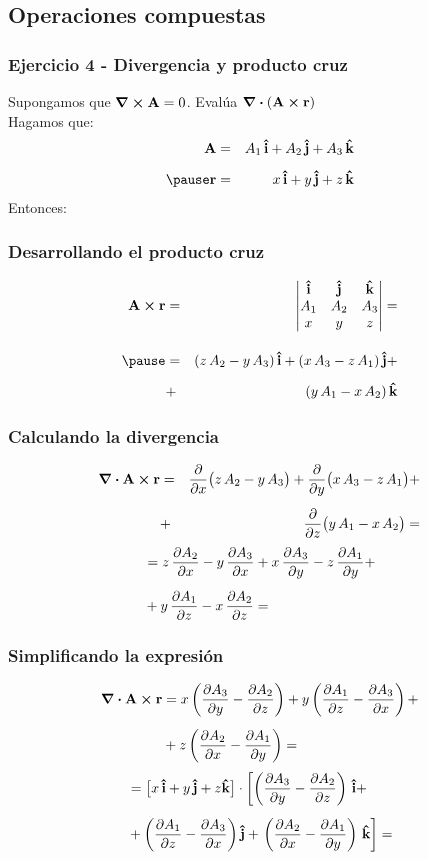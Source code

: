 \documentclass[12pt]{beamer}
\begin{document}
\subsection{Operaciones compuestas}

\begin{frame}
\frametitle{Ejercicio 4 - Divergencia y producto cruz}
Supongamos que $\curl{\vb{A}} = 0$. Evalúa $\div{(\vb{A} \cp \vb{r})}$
\\
\bigskip
\pause
Hagamos que:
\begin{eqnarray*}
\vb{A} &=& A_{1} \, \vu{i} + A_{2} \, \vu{j} + A_{3} \, \vu{k} \\[0.5em] \pause
\vb{r} &=& x \, \vu{i} + y \, \vu{j} + z \, \vu{k}
\end{eqnarray*}
Entonces:
\end{frame}
\begin{frame}
\frametitle{Desarrollando el producto cruz}
\begin{eqnarray*}
\vb{A} \cp \vb{r} &=& \mqty|
\vu{i} & \vu{j} & \vu{k} \\
A_{1} & A_{2} & A_{3} \\
x & y & z | = \\[1em] \pause
&=& (z \, A_{2} - y \, A_{3}) \, \vu{i} + (x \, A_{3} - z \, A_{1}) \, \vu{j} + \\[0.5em]
&+& (y \, A_{1} - x \, A_{2}) \, \vu{k} 
\end{eqnarray*}
\end{frame}
\begin{frame}
\frametitle{Calculando la divergencia}
\begin{eqnarray*}
\div{\vb{A} \cp \vb{r}} &=& \pdv{x} \big( z \, A_{2} - y \, A_{3} \big) + \pdv{y} \big( x \, A_{3} - z \, A_{1} \big) + \\[0.5em]
&+& \pdv{z} \big( y \, A_{1} - x \, A_{2} \big)=
\end{eqnarray*}
\pause
\begin{align*}
&= z \, \pdv{A_{2}}{x} - y \, \pdv{A_{3}}{x} + x \, \pdv{A_{3}}{y} - z \, \pdv{A_{1}}{y} + \\[0.5em]
&+ y \, \pdv{A_{1}}{z} - x \, \pdv{A_{2}}{z} = 
\end{align*}
\end{frame}
\begin{frame}
\frametitle{Simplificando la expresión}
\vspace{-1cm}
\begin{align*}
\div{\vb{A} \cp \vb{r}} &= x \left( \pdv{A_{3}}{y} - \pdv{A_{2}}{z} \right) + y \left( \pdv{A_{1}}{z} - \pdv{A_{3}}{x} \right) + \\[0.5em]
&+ z \left( \pdv{A_{2}}{x} - \pdv{A_{1}}{y} \right) =
\end{align*}
\pause
\begin{align*}
&= \big[ x \, \vu{i} + y \, \vu{j} + z \vu{k} \big] \cdot \left[ \left( \pdv{A_{3}}{y} - \pdv{A_{2}}{z} \right) \, \vu{i} + \right. \\[0.5em]
&+ \left( \pdv{A_{1}}{z} - \pdv{A_{3}}{x} \right) \vu{j} + \left. \left( \pdv{A_{2}}{x} - \pdv{A_{1}}{y} \right) \, \vu{k} \right] =
\end{align*}
\end{frame}
\end{document}
